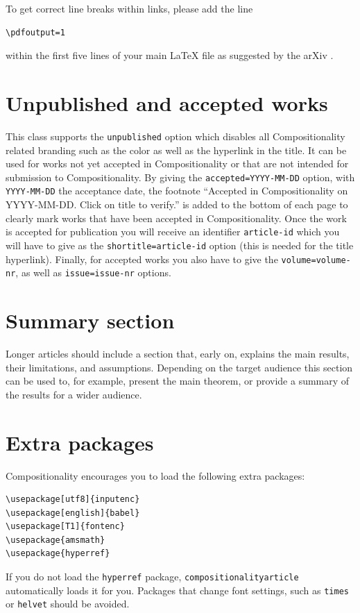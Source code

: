 \documentclass[a4paper,onecolumn,superscriptaddress,10pt,issue=1, volume=2, shorttitle=papers]{compositionalityarticle}
\begin{document}
To get correct line breaks within links, please add the line 
\begin{verbatim}
\pdfoutput=1
\end{verbatim}
within the first five lines of your main LaTeX file as suggested by the arXiv \cite{arxivpdfoutput}.

\section{Unpublished and accepted works}
This class supports the \texttt{unpublished} option which disables all Compositionality related branding such as the color as well as the hyperlink in the title.
It can be used for works not yet accepted in Compositionality or  that are not intended for submission to Compositionality.
By giving the \texttt{accepted=YYYY-MM-DD} option, with \texttt{YYYY-MM-DD} the acceptance date, the footnote ``Accepted in Compositionality on YYYY-MM-DD. Click on title to verify.'' is  added to the bottom of each page to clearly mark works that have been accepted in Compositionality. Once the work is accepted for publication you will receive an identifier {\tt article-id} which you will have to give as the {\tt shortitle=article-id} option (this is needed for the title hyperlink). Finally, for accepted works you also have to  give the  \texttt{volume=volume-nr}, as well as \texttt{issue=issue-nr} options.

\section{Summary section}
Longer articles should include a section that, early on, explains the main results, their limitations, and assumptions.
Depending on the target audience this section can be used to, for example, present the main theorem, or provide a summary of the results for a wider audience.

\section{Extra packages}
Compositionality encourages you to load the following extra packages:
\begin{verbatim}
\usepackage[utf8]{inputenc}
\usepackage[english]{babel}
\usepackage[T1]{fontenc}
\usepackage{amsmath}
\usepackage{hyperref}
\end{verbatim}
If you do not load the \texttt{hyperref} package, \texttt{compositionalityarticle} automatically loads it for you.
Packages that change font settings, such as \texttt{times} or \texttt{helvet} should be avoided.
\end{document}
